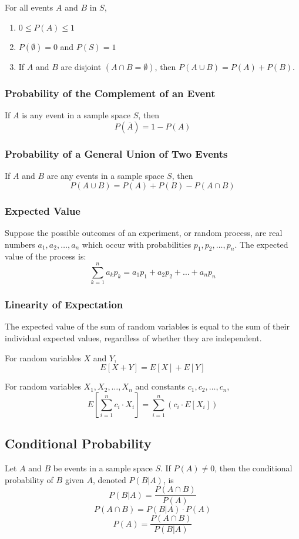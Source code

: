 \documentclass{article}
\theoremstyle{plain}
\theoremstyle{definition}
\theoremstyle{remark}
\begin{document}
For all events $A$ and $B$ in $S$,
\begin{enumerate}
    \item $0 \leq P(A) \leq 1$
    \item $P(\emptyset) = 0$ and $P(S) = 1$
    \item If $A$ and $B$ are disjoint $(A \cap B = \emptyset)$, then $P(A \cup B) = P(A) + P(B)$.
\end{enumerate}
 
\subsubsection*{Probability of the Complement of an Event}
If $A$ is any event in a sample space $S$, then
\[ P(\bar{A}) = 1 - P(A) \]
 
\subsubsection*{Probability of a General Union of Two Events}
If $A$ and $B$ are any events in a sample space $S$, then
\[ P(A \cup B) = P(A) + P(B) - P(A \cap B) \]
 
\subsubsection*{Expected Value}
Suppose the possible outcomes of an experiment, or random process, are real numbers $a_1, a_2, \dots, a_n$ which occur with probabilities $p_1, p_2, \dots, p_n$. The expected value of the process is:
\[ \sum_{k=1}^{n} a_k p_k = a_1 p_1 + a_2 p_2 + \dots + a_n p_n \]
 
\subsubsection*{Linearity of Expectation}
The expected value of the sum of random variables is equal to the sum of their individual expected values, regardless of whether they are independent.
 
For random variables $X$ and $Y$,
\[ E[X+Y] = E[X] + E[Y] \]
 
For random variables $X_1, X_2, \dots, X_n$ and constants $c_1, c_2, \dots, c_n$,
\[ E\left[\sum_{i=1}^{n} c_i \cdot X_i\right] = \sum_{i=1}^{n} (c_i \cdot E[X_i]) \]
 
\subsection{Conditional Probability}
Let $A$ and $B$ be events in a sample space $S$. If $P(A) \neq 0$, then the conditional probability of $B$ given $A$, denoted $P(B|A)$, is
\[ P(B|A) = \frac{P(A \cap B)}{P(A)} \tag{9.9.1} \]
\[ P(A \cap B) = P(B|A) \cdot P(A) \tag{9.9.2} \]
\[ P(A) = \frac{P(A \cap B)}{P(B|A)} \tag{9.9.3} \]
 
\end{document}
